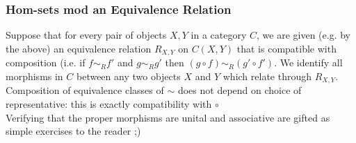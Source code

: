 \documentclass{article}
\begin{document}
\subsubsection{Hom-sets mod an Equivalence Relation}
Suppose that for every pair of objects $X,Y$ in a category $C$, we are given (e.g. by the above) an equivalence relation $R_{X,Y}$ on $C(X,Y)$ that is compatible with composition (i.e. if $f\sim_Rf'$ and $g\sim_Rg'$ then $(g\circ{}f)\sim_R(g'\circ{}f')$.  We identify all morphisms in $C$ between any two objects $X$ and $Y$ which relate through $R_{X,Y}$.  Composition of equivalence classes of $\sim{}$ does not depend on choice of representative: this is exactly compatibility with $\circ{}$\\Verifying that the proper morphisms are unital and associative are gifted as simple exercises to the reader ;)
\end{document}
